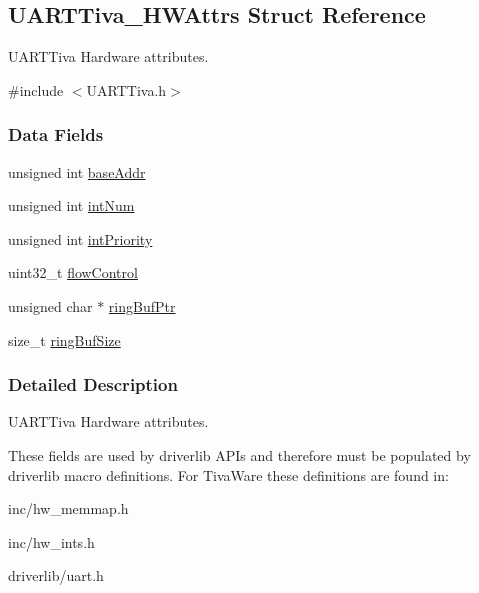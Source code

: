 \subsection{U\+A\+R\+T\+Tiva\+\_\+\+H\+W\+Attrs Struct Reference}
\label{struct_u_a_r_t_tiva___h_w_attrs}


U\+A\+R\+T\+Tiva Hardware attributes.  




{\ttfamily \#include $<$U\+A\+R\+T\+Tiva.\+h$>$}

\subsubsection*{Data Fields}
\begin{DoxyCompactItemize}
\item 
unsigned int \hyperlink{struct_u_a_r_t_tiva___h_w_attrs_abecf13eceeaf44f1781aa2bfae1edad4}{base\+Addr}
\item 
unsigned int \hyperlink{struct_u_a_r_t_tiva___h_w_attrs_a3353583599880bab5429fcbbd189f89c}{int\+Num}
\item 
unsigned int \hyperlink{struct_u_a_r_t_tiva___h_w_attrs_ae442562721bedb759753fdfba3bcb93b}{int\+Priority}
\item 
uint32\+\_\+t \hyperlink{struct_u_a_r_t_tiva___h_w_attrs_ad8f36b7ebba17d7cecf8cc6bb3bac8ed}{flow\+Control}
\item 
unsigned char $\ast$ \hyperlink{struct_u_a_r_t_tiva___h_w_attrs_a6382c2f9dc1fc1648e051d002a5c8521}{ring\+Buf\+Ptr}
\item 
size\+\_\+t \hyperlink{struct_u_a_r_t_tiva___h_w_attrs_a71cdbd83ab94cd22b14da7204cd80b0d}{ring\+Buf\+Size}
\end{DoxyCompactItemize}


\subsubsection{Detailed Description}
U\+A\+R\+T\+Tiva Hardware attributes. 

These fields are used by driverlib A\+P\+Is and therefore must be populated by driverlib macro definitions. For Tiva\+Ware these definitions are found in\+:
\begin{DoxyItemize}
\item inc/hw\+\_\+memmap.\+h
\item inc/hw\+\_\+ints.\+h
\item driverlib/uart.\+h
\end{DoxyItemize}

